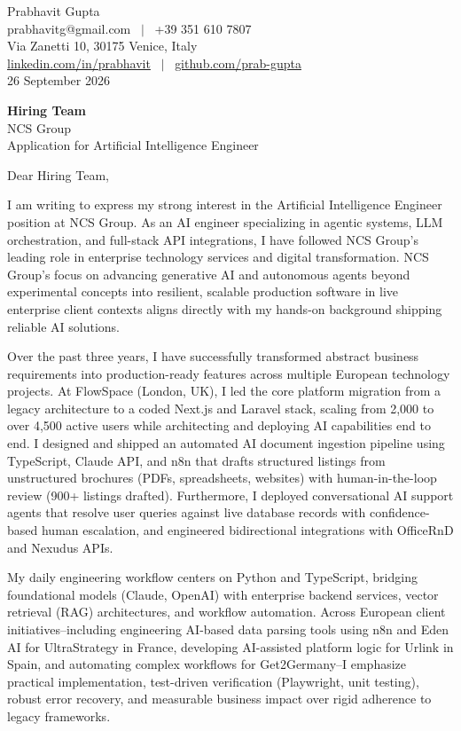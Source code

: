 \documentclass[11pt,a4paper]{article}
\begin{document}
Prabhavit Gupta\\
prabhavitg@gmail.com ~$\vert$~ +39 351 610 7807\\
Via Zanetti 10, 30175 Venice, Italy\\
\href{https://www.linkedin.com/in/prabhavit/}{linkedin.com/in/prabhavit} ~$\vert$~ \href{https://github.com/prab-gupta}{github.com/prab-gupta}\\
26 September 2026

\textbf{Hiring Team}\\
NCS Group\\
Application for Artificial Intelligence Engineer

Dear Hiring Team,

I am writing to express my strong interest in the Artificial Intelligence Engineer position at NCS Group. As an AI engineer specializing in agentic systems, LLM orchestration, and full-stack API integrations, I have followed NCS Group's leading role in enterprise technology services and digital transformation. NCS Group's focus on advancing generative AI and autonomous agents beyond experimental concepts into resilient, scalable production software in live enterprise client contexts aligns directly with my hands-on background shipping reliable AI solutions.

Over the past three years, I have successfully transformed abstract business requirements into production-ready features across multiple European technology projects. At FlowSpace (London, UK), I led the core platform migration from a legacy architecture to a coded Next.js and Laravel stack, scaling from 2,000 to over 4,500 active users while architecting and deploying AI capabilities end to end. I designed and shipped an automated AI document ingestion pipeline using TypeScript, Claude API, and n8n that drafts structured listings from unstructured brochures (PDFs, spreadsheets, websites) with human-in-the-loop review (900+ listings drafted). Furthermore, I deployed conversational AI support agents that resolve user queries against live database records with confidence-based human escalation, and engineered bidirectional integrations with OfficeRnD and Nexudus APIs.

My daily engineering workflow centers on Python and TypeScript, bridging foundational models (Claude, OpenAI) with enterprise backend services, vector retrieval (RAG) architectures, and workflow automation. Across European client initiatives--including engineering AI-based data parsing tools using n8n and Eden AI for UltraStrategy in France, developing AI-assisted platform logic for Urlink in Spain, and automating complex workflows for Get2Germany--I emphasize practical implementation, test-driven verification (Playwright, unit testing), robust error recovery, and measurable business impact over rigid adherence to legacy frameworks.
\end{document}
